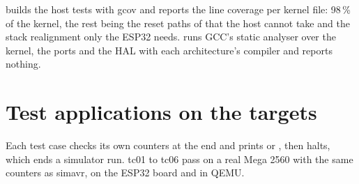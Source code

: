  builds the host tests with gcov and reports the line coverage per
kernel file: 98\,\% of the kernel, the rest being the reset paths of 
that the host cannot take and the stack realignment only the ESP32 needs.  runs GCC's static analyser over the kernel, the ports and the HAL with each
architecture's compiler and reports nothing.

\section{Test applications on the targets}

Each test case checks its own counters at the end and prints  or
, then halts, which ends a simulator run. tc01 to tc06 pass on a real Mega
2560 with the same counters as simavr, on the ESP32 board and in QEMU.

